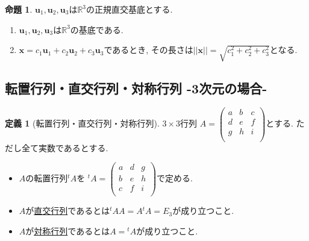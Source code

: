 \documentclass[dvipdfmx,a4paper,11pt]{article}
\newcommand{\R}{\mathbb{R}}
\theoremstyle{definition}
\newtheorem{prop}[thm]{命題}
\newtheorem{dfn}[thm]{定義}
\begin{document}
   \begin{tcolorbox}[
    colback = white,
    colframe = green!35!black,
    fonttitle = \bfseries,
    breakable = true]
    \begin{prop}
   $\bm{u}_1, \bm{u}_2, \bm{u}_3$は$\R^3$の正規直交基底とする.
  \begin{enumerate}
  \setlength{\parskip}{0cm}
 \setlength{\itemsep}{0pt} 
\item  $\bm{u}_1, \bm{u}_2, \bm{u}_3$は$\R^3$の基底である.
\item $\bm{x} = c_1\bm{u}_1 + c_2\bm{u}_2 + c_3\bm{u}_3$であるとき, その長さは$|| \bm{x} ||=\sqrt{c_{1}^{2} + c_{2}^{2} + c_{3}^2}$となる. 
  \end{enumerate}
  \end{prop}
 \end{tcolorbox}
 
 
 
 \subsection{転置行列・直交行列・対称行列 -3次元の場合-}
 
 \begin{tcolorbox}[
    colback = white,
    colframe = green!35!black,
    fonttitle = \bfseries,
    breakable = true]
    \begin{dfn}[転置行列・直交行列・対称行列]
$3\times 3$行列
$
A=\begin{pmatrix}
a& b &c\\
d & e& f\\
g & h& i \\
\end{pmatrix}
$とする. ただし全て実数であるとする. 
\begin{itemize}
\setlength{\parskip}{0cm}
 \setlength{\itemsep}{0pt} 
\item $A$の転置行列${}^t A$を
${}^t A =\begin{pmatrix}
a& d &g\\
b& e& h\\
c & f& i \\
\end{pmatrix}
$で定める.
\item $A$が\underline{直交行列}であるとは${}^t A A= A {}^t A = E_3$が成り立つこと.
\item $A$が\underline{対称行列}であるとは$ A= {}^t A$が成り立つこと.
\end{itemize}
\end{dfn}
 \end{tcolorbox}
 
\end{document}
